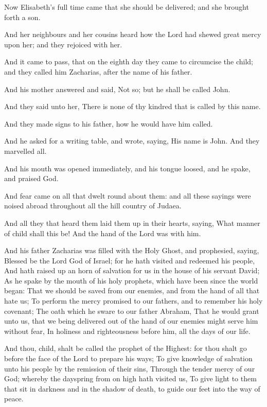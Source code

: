 \verse Now Elisabeth's full time came that she should be delivered; and she brought forth a son.

\verse And her neighbours and her cousins heard how the Lord had shewed great mercy upon her; and they rejoiced with her.

\verse And it came to pass, that on the eighth day they came to circumcise the child; and they called him Zacharias, after the name of his father.

\verse And his mother answered and said, Not so; but he shall be called John.

\verse And they said unto her, There is none of thy kindred that is called by this name.

\verse And they made signs to his father, how he would have him called.

\verse And he asked for a writing table, and wrote, saying, His name is John. And they marvelled all.

\verse And his mouth was opened immediately, and his tongue loosed, and he spake, and praised God.

\verse And fear came on all that dwelt round about them: and all these sayings were noised abroad throughout all the hill country of Judaea.

\verse And all they that heard them laid them up in their hearts, saying, What manner of child shall this be! And the hand of the Lord was with him.

\verse And his father Zacharias was filled with the Holy Ghost, and prophesied, saying, \verse Blessed be the Lord God of Israel; for he hath visited and redeemed his people, \verse And hath raised up an horn of salvation for us in the house of his servant David; \verse As he spake by the mouth of his holy prophets, which have been since the world began: \verse That we should be saved from our enemies, and from the hand of all that hate us; \verse To perform the mercy promised to our fathers, and to remember his holy covenant; \verse The oath which he sware to our father Abraham, \verse That he would grant unto us, that we being delivered out of the hand of our enemies might serve him without fear, \verse In holiness and righteousness before him, all the days of our life.

\verse And thou, child, shalt be called the prophet of the Highest: for thou shalt go before the face of the Lord to prepare his ways; \verse To give knowledge of salvation unto his people by the remission of their sins, \verse Through the tender mercy of our God; whereby the dayspring from on high hath visited us, \verse To give light to them that sit in darkness and in the shadow of death, to guide our feet into the way of peace.

